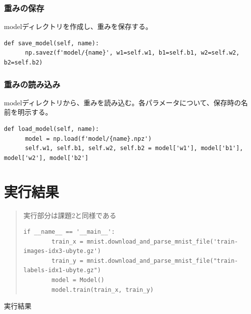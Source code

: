 \documentclass[platex,dvipdfmx]{jsarticle}
\begin{document}
  \subsubsection{重みの保存}

  modelディレクトリを作成し、重みを保存する。

  \begin{lstlisting}[caption=ex3.py, label=save_model]
    def save_model(self, name):
      np.savez(f'model/{name}', w1=self.w1, b1=self.b1, w2=self.w2, b2=self.b2)
  \end{lstlisting}

  \subsubsection{重みの読み込み}

  modelディレクトリから、重みを読み込む。各パラメータについて、保存時の名前を明示する。

  \begin{lstlisting}[caption=ex3.py, label=load_model]
    def load_model(self, name):
      model = np.load(f'model/{name}.npz')
      self.w1, self.b1, self.w2, self.b2 = model['w1'], model['b1'], model['w2'], model['b2']
  \end{lstlisting}

  \newpage

  \section{実行結果}

  \begin{quote}
    実行部分は課題2と同様である

    \begin{lstlisting}[caption=ex3.py, label=main]
      if __name__ == '__main__': 
        train_x = mnist.download_and_parse_mnist_file('train-images-idx3-ubyte.gz')
        train_y = mnist.download_and_parse_mnist_file("train-labels-idx1-ubyte.gz")
        model = Model()
        model.train(train_x, train_y)
    \end{lstlisting}
  \end{quote}
  
  実行結果
\end{document}
